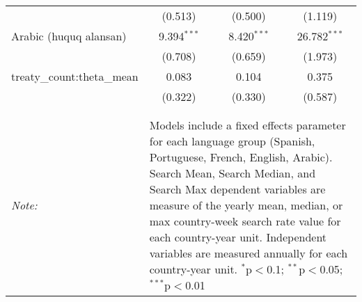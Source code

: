 \begin{table}[!htbp]
\begin{tabular}{@{\extracolsep{5pt}}lccc}
  & (0.513) & (0.500) & (1.119) \\ 
  Arabic (huquq alansan) & 9.394$^{***}$ & 8.420$^{***}$ & 26.782$^{***}$ \\ 
  & (0.708) & (0.659) & (1.973) \\ 
  treaty\_count:theta\_mean & 0.083 & 0.104 & 0.375 \\ 
  & (0.322) & (0.330) & (0.587) \\ 
 \hline \\[-1.8ex] 
\hline 
\hline \\[-1.8ex] 
\textit{Note:}  & \multicolumn{3}{l}{\parbox[t]{8cm}{Models include a fixed effects parameter for each language group (Spanish, Portuguese, French, English, Arabic). Search Mean, Search Median, and Search Max dependent variables are measure of the yearly mean, median, or max country-week search rate value for each country-year unit. Independent variables are measured annually for each country-year unit. $^{*}$p$<$0.1; $^{**}$p$<$0.05; $^{***}$p$<$0.01}} \\ 
\end{tabular} 
\end{table} 
